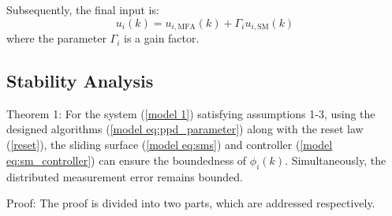 \documentclass[journal,onecolumn]{IEEEtran}
\begin{document}
Subsequently, the final input is:
\begin{equation}
    \label{model eq:mfasmc}
    u_i(k) = u_{i,\text{MFA}}(k) + \Gamma_i  u_{i,\text{SM}}(k)
\end{equation}
where the parameter \(\Gamma_i\) is a gain factor.


\subsection{Stability Analysis}

Theorem 1: For the system (\ref{model 1}) satisfying assumptions 1-3, using  the designed algorithms (\ref{model eq:ppd_parameter}) along with the reset law (\ref{reset}), the sliding surface (\ref{model eq:sms}) and controller (\ref{model eq:sm_controller}) can ensure the boundedness of $ \hat{\phi}_i(k) $. Simultaneously, the distributed measurement error remains bounded.



Proof: The proof is divided into two parts, which are addressed respectively.
\end{document}

